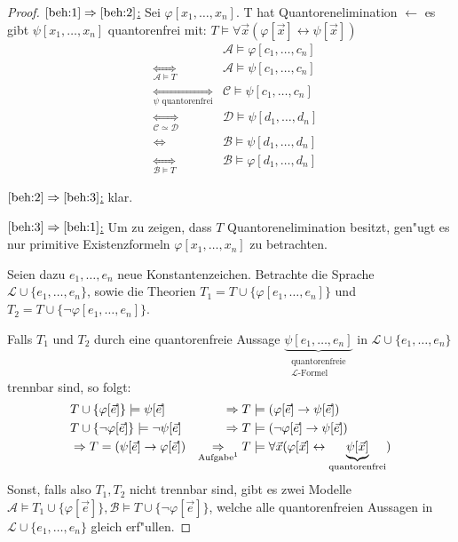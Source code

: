\documentclass[a4paper,12pt,numbers=noenddot,parskip=full]{scrartcl}
\newcommand{\scrL}{\mathcal{L}}
\newcommand{\scrA}{\mathcal{A}}
\newcommand{\scrB}{\mathcal{B}}
\newcommand{\scrC}{\mathcal{C}}
\newcommand{\scrD}{\mathcal{D}}
\theoremstyle{dotless}
\theoremstyle{remark}
\begin{document}
\begin{proof}
	\underline{$\ref{beh:1}\Rightarrow\ref{beh:2}$:} Sei $\varphi[x_1, \dots, x_n]$. T hat Quantorenelimination $\longleftarrow$ es gibt $\psi[x_1, \dots, x_n]$ quantorenfrei mit: $T \models \forall \vec{x} (\varphi[\vec{x}] \leftrightarrow \psi[\vec{x}])$
	\begin{align*}
		&&\scrA \models \varphi[c_1, \dots, c_n]\\
		&\underset{\scrA \models T}{\Leftrightarrow} &\scrA \models \psi[c_1, \dots, c_n]\\
		&\underset{\psi \text{ quantorenfrei}}{\Leftrightarrow} &\scrC \models \psi[c_1, \dots, c_n]\\
		&\underset{\scrC \simeq \scrD}{\Leftrightarrow} &\scrD \models \psi[d_1, \dots, d_n]\\
		&\Leftrightarrow &\scrB \models \psi[d_1, \dots, d_n]\\
		&\underset{\scrB \models T}{\Leftrightarrow} &\scrB \models \varphi[d_1, \dots, d_n]
	\end{align*}
	
	\underline{$\ref{beh:2} \Rightarrow \ref{beh:3}$:} klar.
	
	\underline{$\ref{beh:3} \Rightarrow \ref{beh:1}$:} Um zu zeigen, dass $T$ Quantorenelimination besitzt, gen"ugt es nur primitive Existenzformeln $\varphi[x_1, \dots, x_n]$ zu betrachten. 
	
	Seien dazu $e_1, \dots, e_n$ neue Konstantenzeichen. Betrachte die Sprache $\scrL \cup \{e_1, \dots, e_n \}$, sowie die Theorien $T_1 = T \cup \{\varphi[e_1, \dots, e_n] \}$ und $T_2 = T \cup \{\lnot \varphi[e_1, \dots, e_n]\}$.
	
	Falls $T_1$ und $T_2$ durch eine quantorenfreie Aussage $\underbrace{\psi[e_1, \dots, e_n]}_{\substack{\text{quantorenfreie}\\ \scrL \text{-Formel}}}$ in $\scrL \cup \{e_1, \dots, e_n \}$ trennbar sind, so folgt:
	\begin{align*}
		&T \cup \{\varphi[\vec{e}] \} \models \psi[\vec{e}] &\Rightarrow T &\models (\varphi[\vec{e}] \rightarrow \psi[\vec{e}])\\
		&T \cup \{\lnot\varphi[\vec{e}] \} \models \lnot\psi[\vec{e}] &\Rightarrow T &\models (\lnot\varphi[\vec{e}] \rightarrow \psi[\vec{e}])\\
		&\Rightarrow T = (\psi[\vec{e}] \rightarrow \varphi[\vec{e}]) &\underset{\text{Aufgabe\footnotemark}}{\Rightarrow} T &\models \forall \vec{x} (\varphi[\vec{x}] \leftrightarrow \underbrace{\psi[\vec{x}]}_{\text{quantorenfrei}})
	\end{align*}
	Sonst, falls also $T_1, T_2$ nicht trennbar sind, gibt es zwei Modelle $\scrA \models T_1 \cup \{\varphi[\vec{e}] \}, \scrB \models T \cup \{\lnot \varphi[\vec{e}] \}$, welche alle quantorenfreien Aussagen in $\scrL \cup \{e_1, \dots, e_n \}$ gleich erf"ullen.
	

\end{proof}
\end{document}

